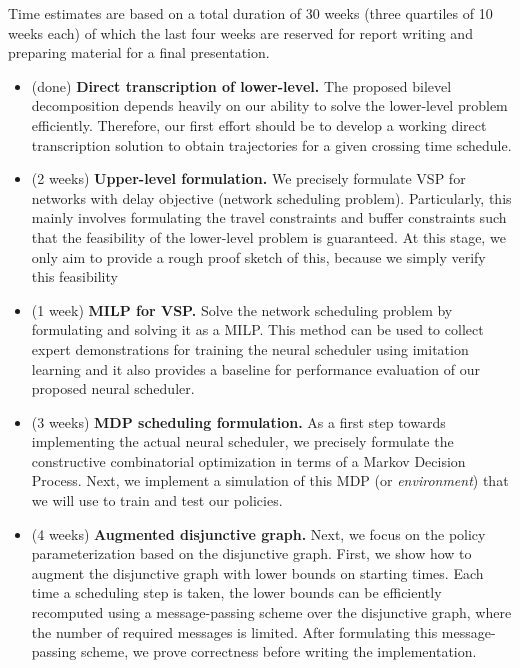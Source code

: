 \documentclass{article}
\theoremstyle{definition}
\theoremstyle{plain}
\begin{document}
Time estimates are based on a total duration of 30 weeks (three quartiles of 10
weeks each) of which the last four weeks are reserved for report writing and
preparing material for a final presentation.

\begin{itemize}
  \item (done) \textbf{Direct transcription of lower-level.} The proposed bilevel
        decomposition depends heavily on our ability to solve the lower-level
        problem efficiently. Therefore, our first effort should be to develop a
        working direct transcription solution to obtain trajectories for a given
        crossing time schedule.

  \item (2 weeks) \textbf{Upper-level formulation.} We precisely formulate VSP for
        networks with delay objective (network scheduling problem).
        Particularly, this mainly involves formulating the travel constraints
        and buffer constraints such that the feasibility of the lower-level problem
        is guaranteed. At this stage, we only aim to provide a rough proof
        sketch of this, because we simply verify this feasibility


  \item (1 week) \textbf{MILP for VSP.} Solve the network scheduling problem by formulating and
        solving it as a MILP. This method can be used to collect expert
        demonstrations for training the neural scheduler using imitation
        learning and it also provides a baseline for performance evaluation of
        our proposed neural scheduler.

  \item (3 weeks) \textbf{MDP scheduling formulation.} As a first step towards implementing
        the actual neural scheduler, we precisely formulate the constructive
        combinatorial optimization in terms of a Markov Decision Process. Next,
        we implement a simulation of this MDP (or \textit{environment}) that we will
        use to train and test our policies.

  \item (4 weeks) \textbf{Augmented disjunctive graph.} Next, we focus on the policy
        parameterization based on the disjunctive graph. First, we show how to
        augment the disjunctive graph with lower bounds on starting times. Each
        time a scheduling step is taken, the lower bounds can be efficiently
        recomputed using a message-passing scheme over the disjunctive graph,
        where the number of required messages is limited. After formulating this
        message-passing scheme, we prove correctness before writing the
        implementation.


\end{itemize}
\end{document}
